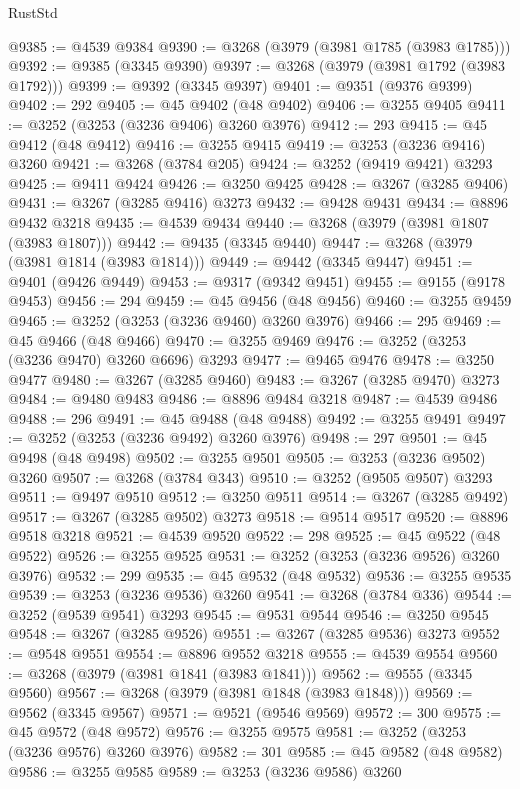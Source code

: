 \begin{lexlean}{RustStd}
\begin{coremodule}
{\begin{coremodule}
{{{{{{{{{{{{{{{{{{{{{{{{{{{{{{{{{{{{{{{@9385 := @4539 @9384
@9390 := @3268 (@3979 (@3981 @1785 (@3983 @1785)))
@9392 := @9385 (@3345 @9390)
@9397 := @3268 (@3979 (@3981 @1792 (@3983 @1792)))
@9399 := @9392 (@3345 @9397)
@9401 := @9351 (@9376 @9399)
@9402 := 292
@9405 := @45 @9402 (@48 @9402)
@9406 := @3255 @9405
@9411 := @3252 (@3253 (@3236 @9406) @3260 @3976)
@9412 := 293
@9415 := @45 @9412 (@48 @9412)
@9416 := @3255 @9415
@9419 := @3253 (@3236 @9416) @3260
@9421 := @3268 (@3784 @205)
@9424 := @3252 (@9419 @9421) @3293
@9425 := @9411 @9424
@9426 := @3250 @9425
@9428 := @3267 (@3285 @9406)
@9431 := @3267 (@3285 @9416) @3273
@9432 := @9428 @9431
@9434 := @8896 @9432 @3218
@9435 := @4539 @9434
@9440 := @3268 (@3979 (@3981 @1807 (@3983 @1807)))
@9442 := @9435 (@3345 @9440)
@9447 := @3268 (@3979 (@3981 @1814 (@3983 @1814)))
@9449 := @9442 (@3345 @9447)
@9451 := @9401 (@9426 @9449)
@9453 := @9317 (@9342 @9451)
@9455 := @9155 (@9178 @9453)
@9456 := 294
@9459 := @45 @9456 (@48 @9456)
@9460 := @3255 @9459
@9465 := @3252 (@3253 (@3236 @9460) @3260 @3976)
@9466 := 295
@9469 := @45 @9466 (@48 @9466)
@9470 := @3255 @9469
@9476 := @3252 (@3253 (@3236 @9470) @3260 @6696) @3293
@9477 := @9465 @9476
@9478 := @3250 @9477
@9480 := @3267 (@3285 @9460)
@9483 := @3267 (@3285 @9470) @3273
@9484 := @9480 @9483
@9486 := @8896 @9484 @3218
@9487 := @4539 @9486
@9488 := 296
@9491 := @45 @9488 (@48 @9488)
@9492 := @3255 @9491
@9497 := @3252 (@3253 (@3236 @9492) @3260 @3976)
@9498 := 297
@9501 := @45 @9498 (@48 @9498)
@9502 := @3255 @9501
@9505 := @3253 (@3236 @9502) @3260
@9507 := @3268 (@3784 @343)
@9510 := @3252 (@9505 @9507) @3293
@9511 := @9497 @9510
@9512 := @3250 @9511
@9514 := @3267 (@3285 @9492)
@9517 := @3267 (@3285 @9502) @3273
@9518 := @9514 @9517
@9520 := @8896 @9518 @3218
@9521 := @4539 @9520
@9522 := 298
@9525 := @45 @9522 (@48 @9522)
@9526 := @3255 @9525
@9531 := @3252 (@3253 (@3236 @9526) @3260 @3976)
@9532 := 299
@9535 := @45 @9532 (@48 @9532)
@9536 := @3255 @9535
@9539 := @3253 (@3236 @9536) @3260
@9541 := @3268 (@3784 @336)
@9544 := @3252 (@9539 @9541) @3293
@9545 := @9531 @9544
@9546 := @3250 @9545
@9548 := @3267 (@3285 @9526)
@9551 := @3267 (@3285 @9536) @3273
@9552 := @9548 @9551
@9554 := @8896 @9552 @3218
@9555 := @4539 @9554
@9560 := @3268 (@3979 (@3981 @1841 (@3983 @1841)))
@9562 := @9555 (@3345 @9560)
@9567 := @3268 (@3979 (@3981 @1848 (@3983 @1848)))
@9569 := @9562 (@3345 @9567)
@9571 := @9521 (@9546 @9569)
@9572 := 300
@9575 := @45 @9572 (@48 @9572)
@9576 := @3255 @9575
@9581 := @3252 (@3253 (@3236 @9576) @3260 @3976)
@9582 := 301
@9585 := @45 @9582 (@48 @9582)
@9586 := @3255 @9585
@9589 := @3253 (@3236 @9586) @3260
}}}}}}}}}}}}}}}}}}}}}}}}}}}}}}}}}}}}}}}
\end{coremodule}}
\end{coremodule}
\end{lexlean}

